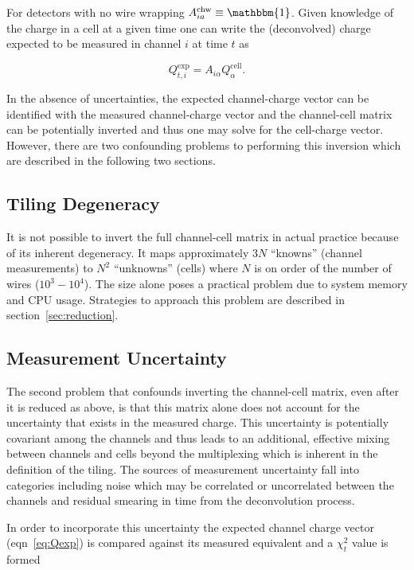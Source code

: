 \documentclass[letter]{article}
\def\mQexp{Q^{\mathrm{exp}}_{t,i}}
\def\mAchc{A_{i\alpha}}
\def\mAchw{A^{\mathrm{chw}}_{ia}}
\def\mQcell{Q^{\mathrm{cell}}_\alpha}
\begin{document}
For detectors with no wire wrapping $\mAchw \equiv \mathbbm{1}$.
Given knowledge of the charge in a cell at a given time one can write
the (deconvolved) charge expected to be measured in channel $i$ at
time $t$ as

\begin{equation}
  \label{eq:Qexp}
  \mQexp = \mAchc \mQcell.
\end{equation}

In the absence of uncertainties, the expected channel-charge vector
can be identified with the measured channel-charge vector and the
channel-cell matrix can be potentially inverted and thus one may solve
for the cell-charge vector.
However, there are two confounding problems to performing this
inversion which are described in the following two sections.


\subsection{Tiling Degeneracy}

It is not possible to invert the full channel-cell matrix in
actual practice because of its inherent degeneracy.
It maps approximately $3N$ ``knowns'' (channel measurements) to $N^2$
``unknowns'' (cells) where $N$ is on order of the number of wires
($10^3-10^4$).
The size alone poses a practical problem due to system memory and CPU usage.
Strategies to approach this problem are described in section~\ref{sec:reduction}.


\subsection{Measurement Uncertainty}

The second problem that confounds inverting the channel-cell matrix,
even after it is reduced as above, is that this matrix alone does not
account for the uncertainty that exists in the measured charge.
This uncertainty is potentially covariant among the channels and thus
leads to an additional, effective mixing between channels and cells
beyond the multiplexing which is inherent in the definition of the
tiling.
The sources of measurement uncertainty fall into categories including
noise which may be correlated or uncorrelated between the channels and
residual smearing in time from the deconvolution process.

In order to incorporate this uncertainty the expected channel charge
vector (eqn~\ref{eq:Qexp}) is compared against its measured equivalent and 
a $\chi^2_t$ value is formed
\end{document}
